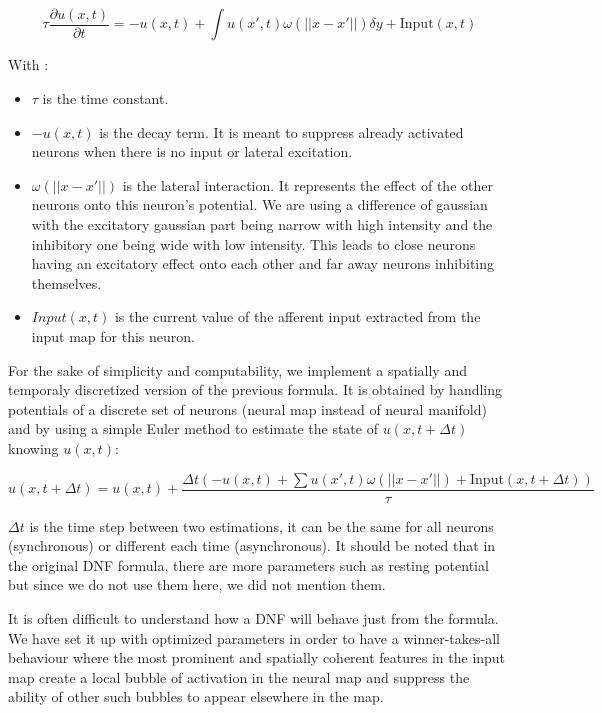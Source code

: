 $$\tau \frac{\partial u(x, t)}{\partial t} = -u(x,t)+\int u(x',t)\omega(||x-x'||)\delta y + \text{Input}(x,t)$$

With :
\begin{itemize}
    \item $\tau$ is the time constant.
    \item $-u(x,t)$ is the decay term. It is meant to suppress already activated neurons when there is no input or lateral excitation.
    \item $\omega(||x-x'||)$ is the lateral interaction. It represents the effect of the other neurons onto this neuron's potential. We are using a difference of gaussian with the excitatory gaussian part being narrow with high intensity and the inhibitory one being wide with low intensity. This leads to close neurons having an excitatory effect onto each other and far away neurons inhibiting themselves.
    \item $Input(x,t)$ is the current value of the afferent input extracted from the input map for this neuron.
\end{itemize}

For the sake of simplicity and computability, we implement a spatially and temporaly discretized version of the previous formula. It is obtained by handling potentials of a discrete set of neurons (neural map instead of neural manifold) and by using a simple Euler method to estimate the state of $u(x,t+\Delta t)$ knowing $u(x,t)$:

$$u(x, t+\Delta t) = u(x, t) +\frac{\Delta t\left(-u(x, t)+\sum u(x', t)\omega(||x-x'||) + \text{Input}(x, t+\Delta t)\right)}{\tau}$$

$\Delta t$ is the time step between two estimations, it can be the same for all neurons (synchronous) or different each time (asynchronous). It should be noted that in the original DNF formula, there are more parameters such as resting potential but since we do not use them here, we did not mention them.

It is often difficult to understand how a DNF will behave just from the formula. We have set it up with optimized parameters in order to have a winner-takes-all behaviour where the most prominent and spatially coherent features in the input map create a local bubble of activation in the neural map and suppress the ability of other such bubbles to appear elsewhere in the map. 


